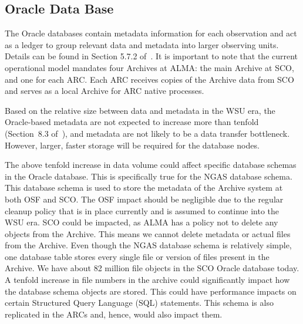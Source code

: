 \subsection{Oracle Data Base} %
\label{sec:oracle_data_base}

The Oracle databases contain metadata information for each observation and act as a ledger to group relevant data and metadata into larger observing units. Details can be found in Section 5.7.2 of~\cite{CSA-IA}. It is important to note that the current operational model mandates four Archives at ALMA: the main Archive at SCO, and one for each ARC. Each ARC receives copies of the Archive data from SCO and serves as a local Archive for ARC native processes.

Based on the relative size between data and metadata in the WSU era, the Oracle-based metadata are not expected to increase more than tenfold (Section~8.3 of~\cite{dtas}), and metadata are not likely to be a data transfer bottleneck. However, larger, faster storage will be required for the database nodes.

The above tenfold increase in data volume could affect specific database schemas in the Oracle database. This is specifically true for the NGAS database schema. This database schema is used to store the metadata of the Archive system at both OSF and SCO. The OSF impact should be negligible due to the regular cleanup policy that is in place currently and is assumed to continue into the WSU era. SCO could be impacted, as ALMA has a policy not to delete any objects from the Archive. This means we cannot delete metadata or actual files from the Archive. Even though the NGAS database schema is relatively simple, one database table stores every single file or version of files present in the Archive. We have about 82 million file objects in the SCO Oracle database today. A tenfold increase in file numbers in the archive could significantly impact how the database schema objects are stored. This could have performance impacts on certain Structured Query Language (SQL) statements. This schema is also replicated in the ARCs and, hence, would also impact them.

